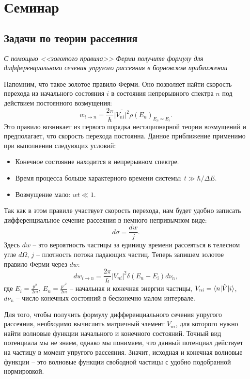 \section{Семинар \thesection}
\subsection{Задачи по теории рассеяния}

\begin{exercise}
  \textit{С помощью <<золотого правила>> Ферми получите формулу для
    дифференциального сечения упругого рассеяния в борновском приближении}
\end{exercise}

Напомним, что такое золотое правило Ферми. Оно позволяет найти скорость
перехода из начального состояния $i$ в состояния непрерывного спектра $n$ под
действием постоянного возмущения:
\[
  w_{i\rightarrow n} = \frac{2\pi}{\hbar}\overline{|V_{ni}|^2} \rho(E_n)_{E_n\simeq E_i}.
\]
Это правило возникает из первого порядка нестационарной теории возмущений и
предполагает, что скорость перехода постоянна. Данное приближение применимо при
выполнении следующих условий:
\begin{itemize}
  \item Конечное состояние находится в непрерывном спектре.
  \item Время процесса больше характерного времени системы: $t \gg \hbar/\Delta E$.
  \item Возмущение мало: $w t \ll 1$.
\end{itemize}

Так как в этом правиле участвует скорость перехода, нам будет удобно записать
дифференциальное сечение рассеяния в немного непривычном виде:
\[
  d\sigma = \frac{dw}{j}.
\]
Здесь $dw$ -- это вероятность частицы за единицу времени рассеяться в телесном
угле $d\Omega$, $j$ -- плотность потока падающих частиц. Теперь запишем золотое
правило Ферми через $dw$:
\[
  dw_{i\to n} = \frac{2\pi}{\hbar}|V_{ni}|^2 \delta(E_n-E_i)d\nu_n,
\]
где $E_i = \frac{p^2}{2m}$, $E_n = \frac{p'^2}{2m}$ -- начальная и конечная
энергии частицы, $V_{ni} = \langle n\rvert\hat{V}\lvert i\rangle$, $d\nu_n$ -- число конечных
состояний в бесконечно малом интервале.

Для того, чтобы получить формулу дифференциального сечения упругого рассеяния,
необходимо вычислить матричный элемент $V_{ni}$, для которого нужно найти
волновые функции начального и конечного состояний. Точный вид потенциала мы не
знаем, однако мы понимаем, что данный потенциал действует на частицу в момент
упругого рассеяния. Значит, исходная и конечная волновые функции -- это
волновые функции свободной частицы с удобно подобранной нормировкой.


